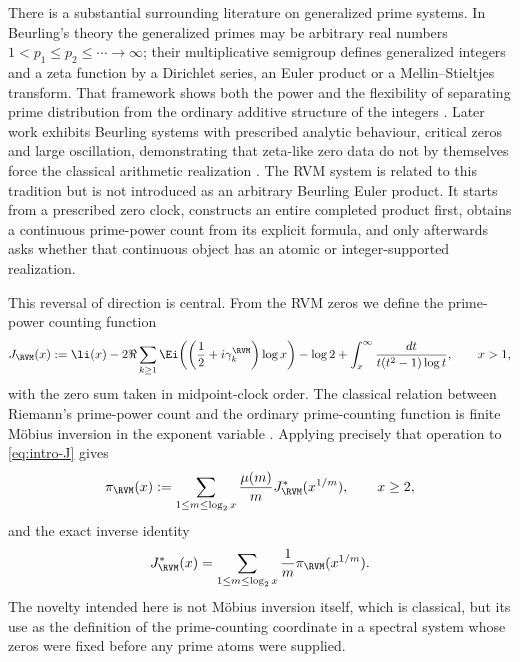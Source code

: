 There is a substantial surrounding literature on generalized prime systems.
In Beurling's theory the generalized primes may be arbitrary real numbers
$1<p_1\le p_2\le\cdots\to\infty$; their multiplicative semigroup defines
generalized integers and a zeta function by a Dirichlet series, an Euler
product or a Mellin--Stieltjes transform.  That framework shows both the power
and the flexibility of separating prime distribution from the ordinary
additive structure of the integers
\cite{Beurling1937,BatemanDiamond1969,Diamond1977}.  Later work exhibits
Beurling systems with prescribed analytic behaviour, critical zeros and large
oscillation, demonstrating that zeta-like zero data do not by themselves force
the classical arithmetic realization
\cite{DiamondMontgomeryVorhauer2006,BrouckeDebruyneVindas2020}.  The RVM system
is related to this tradition but is not introduced as an arbitrary Beurling
Euler product.  It starts from a prescribed zero clock, constructs an entire
completed product first, obtains a continuous prime-power count from its
explicit formula, and only afterwards asks whether that continuous object has
an atomic or integer-supported realization.

This reversal of direction is central.  From the RVM zeros we define the
prime-power counting function
\begin{equation}
 J_{\RVM}(x)
 :=\li(x)
 -2\Re\sum_{k\ge1}
 \Ei\!\left(\left(\frac12+i\gamma_k^{\RVM}\right)\log x\right)
 -\log2
 +\int_x^\infty\frac{dt}{t(t^2-1)\log t},
 \qquad x>1,
 \label{eq:intro-J}
\end{equation}
with the zero sum taken in midpoint-clock order.  The classical relation
between Riemann's prime-power count and the ordinary prime-counting function is
finite M\"obius inversion in the exponent variable
\cite{Riemann1859,Titchmarsh1986,Edwards1974}.  Applying precisely that
operation to \eqref{eq:intro-J} gives
\begin{equation}
 \pi_{\RVM}(x)
 :=\sum_{1\le m\le\log_2x}
 \frac{\mu(m)}{m}J_{\RVM}^{*}(x^{1/m}),
 \qquad x\ge2,
 \label{eq:intro-pi}
\end{equation}
and the exact inverse identity
\begin{equation}
 J_{\RVM}^{*}(x)
 =\sum_{1\le m\le\log_2x}\frac1m
 \pi_{\RVM}(x^{1/m}).
 \label{eq:intro-pi-inverse}
\end{equation}
The novelty intended here is not M\"obius inversion itself, which is classical,
but its use as the definition of the prime-counting coordinate in a spectral
system whose zeros were fixed before any prime atoms were supplied.

